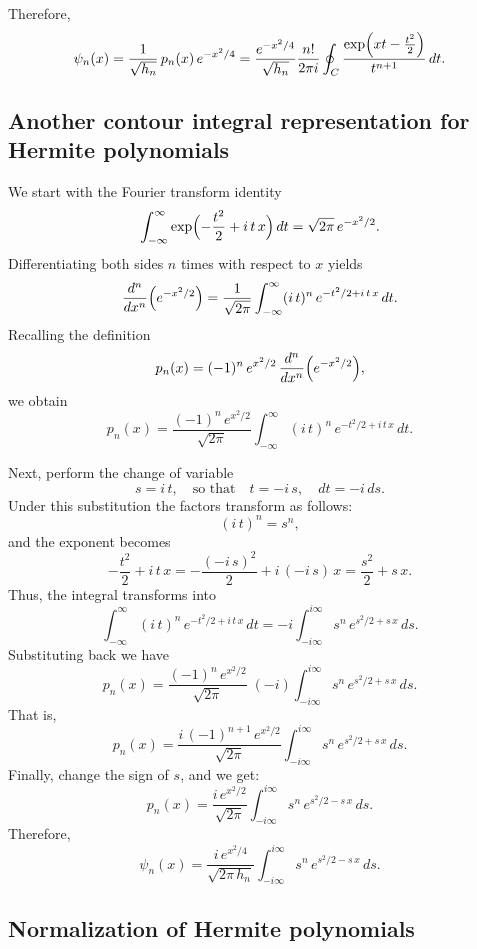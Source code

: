 \documentclass[letterpaper,11pt,oneside,reqno]{book}
\numberwithin{equation}{chapter}  %
\theoremstyle{definition}
\begin{document}
Therefore,
\begin{equation*}
	\psi_n(x)=\frac{1}{\sqrt{h_n}}\,p_n(x)\,e^{-x^2/4}=
	\frac{e^{-x^2/4}}{\sqrt{h_n}}\frac{n!}{2\pi i}\oint_C\frac{\exp\Bigl(xt-\frac{t^2}{2}\Bigr)}{t^{n+1}}\,dt.
\end{equation*}

\subsection{Another contour integral representation for Hermite polynomials}

We start with the Fourier transform identity
\[
\int_{-\infty}^{\infty} \exp\Bigl(-\frac{t^2}{2} + i\,t\,x\Bigr)\,dt
=\sqrt{2\pi}\,e^{-x^2/2}.
\]
Differentiating both sides \(n\) times with respect to \(x\) yields
\[
\frac{d^n}{dx^n}\Bigl(e^{-x^2/2}\Bigr)
=\frac{1}{\sqrt{2\pi}}\int_{-\infty}^{\infty} (i\,t)^n\,e^{-t^2/2+ i\,t\,x}\,dt.
\]
Recalling the definition
\[
p_n(x)=(-1)^n\,e^{x^2/2}\,\frac{d^n}{dx^n}\Bigl(e^{-x^2/2}\Bigr),
\]
we obtain
\[
p_n(x)=\frac{(-1)^n\,e^{x^2/2}}{\sqrt{2\pi}}\int_{-\infty}^{\infty}(i\,t)^n\,e^{-t^2/2+ i\,t\,x}\,dt.
\]

Next, perform the change of variable
\[
s=i\,t,\quad\text{so that}\quad t=-i\,s,\quad dt=-i\,ds.
\]
Under this substitution the factors transform as follows:
\[
(i\,t)^n = s^n,
\]
and the exponent becomes
\[
-\frac{t^2}{2}+ i\,t\,x
= -\frac{(-i\,s)^2}{2}+ i\,(-i\,s)\,x
= \frac{s^2}{2}+ s\,x.
\]
Thus, the integral transforms into
\[
\int_{-\infty}^{\infty}(i\,t)^n\,e^{-t^2/2+ i\,t\,x}\,dt
= -i \int_{-i\infty}^{i\infty} s^n\,e^{s^2/2+ s\,x}\,ds.
\]
Substituting back we have
\[
p_n(x)=\frac{(-1)^n\,e^{x^2/2}}{\sqrt{2\pi}}\;(-i)
\int_{-i\infty}^{i\infty} s^n\,e^{s^2/2+ s\,x}\,ds.
\]
That is,
\[
p_n(x)=\frac{i\,(-1)^{n+1}\,e^{x^2/2}}{\sqrt{2\pi}}
\int_{-i\infty}^{i\infty} s^n\,e^{s^2/2+ s\,x}\,ds.
\]
Finally, change the sign of $s$, and we get:
\[
p_n(x)=\frac{i\,e^{x^2/2}}{\sqrt{2\pi}}
\int_{-i\infty}^{i\infty} s^n\,e^{s^2/2- s\,x}\,ds.
\]
Therefore,
\[
\psi_n(x)=\frac{i\,e^{x^2/4}}{\sqrt{2\pi\,h_n}}
\int_{-i\infty}^{i\infty} s^n\,e^{s^2/2- s\,x}\,ds.
\]

\subsection{Normalization of Hermite polynomials}
\end{document}
